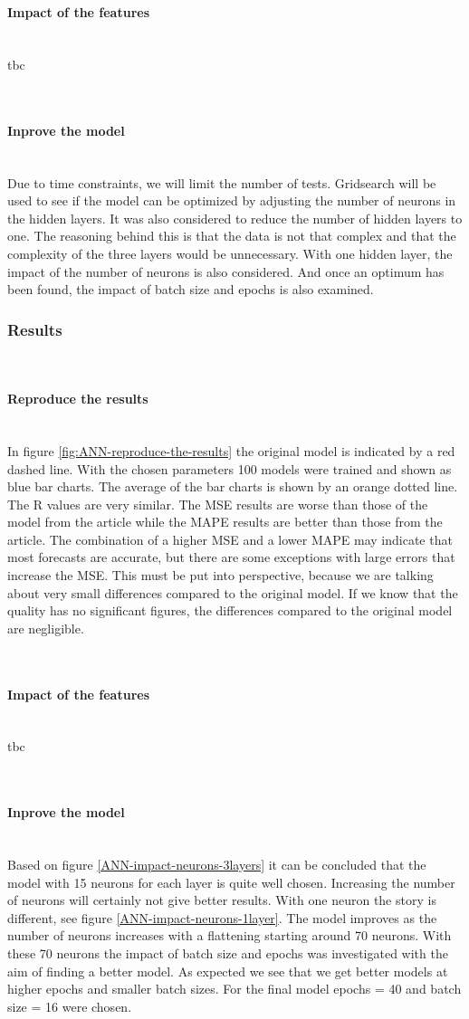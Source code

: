 \documentclass{article}
\newcommand{\subsubsubsection}[1]{%
  \paragraph{#1}\mbox{}\\}
\begin{document}
\subsubsubsection{Impact of the features}
tbc

\subsubsubsection{Inprove the model}
Due to time constraints, we will limit the number of tests. Gridsearch will be used to see if the model can be optimized by adjusting the number of neurons in the hidden layers.
It was also considered to reduce the number of hidden layers to one. The reasoning behind this is that the data is not that complex and that the complexity of the three layers would be unnecessary. With one hidden layer, the impact of the number of neurons is also considered. And once an optimum has been found, the impact of batch size and epochs is also examined.

\subsubsection{Results}

\subsubsubsection{Reproduce the results}

In figure \ref{fig:ANN-reproduce-the-results} the original model is indicated by a red dashed line. With the chosen parameters 100 models were trained and shown as blue bar charts. The average of the bar charts is shown by an orange dotted line.
The R values are very similar. The MSE results are worse than those of the model from the article while the MAPE results are better than those from the article.
The combination of a higher MSE and a lower MAPE may indicate that most forecasts are accurate, but there are some exceptions with large errors that increase the MSE.
This must be put into perspective, because we are talking about very small differences compared to the original model. If we know that the quality has no significant figures, the differences compared to the original model are negligible.


\subsubsubsection{Impact of the features}
tbc

\subsubsubsection{Inprove the model}
Based on figure \ref{ANN-impact-neurons-3layers} it can be concluded that the model with 15 neurons for each layer is quite well chosen. Increasing the number of neurons will certainly not give better results.
With one neuron the story is different, see figure \ref{ANN-impact-neurons-1layer}. The model improves as the number of neurons increases with a flattening starting around 70 neurons. With these 70 neurons the impact of batch size and epochs was investigated with the aim of finding a better model.
As expected we see that we get better models at higher epochs and smaller batch sizes. For the final model epochs = 40 and batch size = 16 were chosen.
\end{document}
